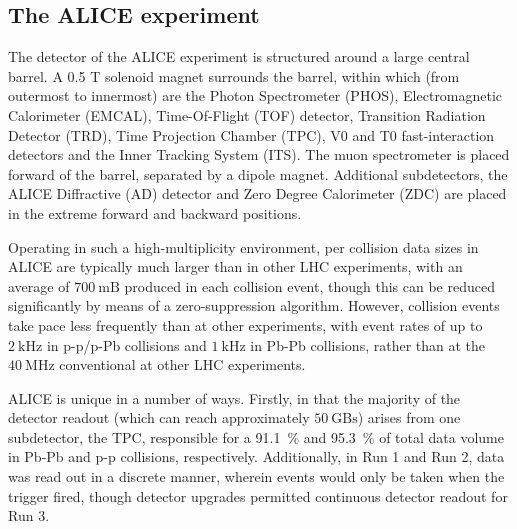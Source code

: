 \subsection{The ALICE experiment}
The detector of the ALICE experiment is structured around a large central barrel. A 0.5 T solenoid magnet surrounds the barrel, within which (from outermost to innermost) are the Photon Spectrometer (PHOS), Electromagnetic Calorimeter (EMCAL), Time-Of-Flight (TOF) detector, Transition Radiation Detector (TRD), Time Projection Chamber (TPC), V0 and T0 fast-interaction detectors and the Inner Tracking System (ITS). The muon spectrometer is placed forward of the barrel, separated by a  dipole magnet. Additional subdetectors, the ALICE Diffractive (AD) detector and Zero Degree Calorimeter (ZDC) are placed in the extreme forward and backward positions.

Operating in such a high-multiplicity environment, per collision data sizes in ALICE are typically much larger than in other LHC experiments, with an average of $700~\mathrm{mB}$ produced in each collision event, though this can be reduced significantly by means of a zero-suppression algorithm. However, collision events take pace less frequently than at other experiments, with event rates of up to $2~\mathrm{kHz}$ in p-p/p-Pb collisions and $1~\mathrm{kHz}$ in Pb-Pb collisions, rather than at the $40~\mathrm{MHz}$ conventional at other LHC experiments.

ALICE is unique in a number of ways. Firstly, in that the majority of the detector readout (which can reach approximately $50~\mathrm{GBs}$) arises from one subdetector, the TPC, responsible for a 91.1~\% and 95.3~\% of total data volume in Pb-Pb and p-p collisions, respectively. Additionally, in Run 1 and Run 2, data was read out in a discrete manner, wherein events would only be taken when the trigger fired, though detector upgrades permitted continuous detector readout for Run 3.

